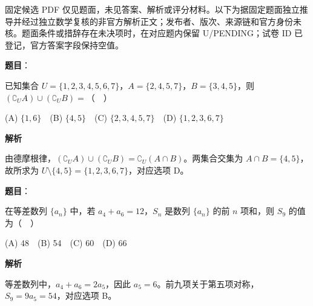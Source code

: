 

\begin{gktip}
固定候选 PDF 仅见题面，未见答案、解析或评分材料。以下为据固定题面独立推导并经过独立数学复核的非官方解析正文；发布者、版次、来源链和官方身份未核。题面条件或措辞存在未决项时，在对应题内保留 U/PENDING；试卷 ID 已登记，官方答案字段保持空值。
\end{gktip}

\begin{answer}

\textbf{题目}：

已知集合 \(U=\{1,2,3,4,5,6,7\}\)，\(A=\{2,4,5,7\}\)，\(B=\{3,4,5\}\)，则 \((\complement_U A)\cup(\complement_U B)=\)（　）

(A) \(\{1,6\}\)　(B) \(\{4,5\}\)　(C) \(\{2,3,4,5,7\}\)　(D) \(\{1,2,3,6,7\}\)

\textbf{解析}

由德摩根律，\((\complement_U A)\cup(\complement_U B)=\complement_U(A\cap B)\)。两集合交集为 \(A\cap B=\{4,5\}\)，故所求为 \(U\setminus\{4,5\}=\{1,2,3,6,7\}\)，对应选项 D。


\end{answer}
\begin{answer}

\textbf{题目}：

在等差数列 \(\{a_n\}\) 中，若 \(a_4+a_6=12\)，\(S_n\) 是数列 \(\{a_n\}\) 的前 \(n\) 项和，则 \(S_9\) 的值为（　）

(A) 48　(B) 54　(C) 60　(D) 66

\textbf{解析}

等差数列中，\(a_4+a_6=2a_5\)，因此 \(a_5=6\)。前九项关于第五项对称，\(S_9=9a_5=54\)，对应选项 B。


\end{answer}

